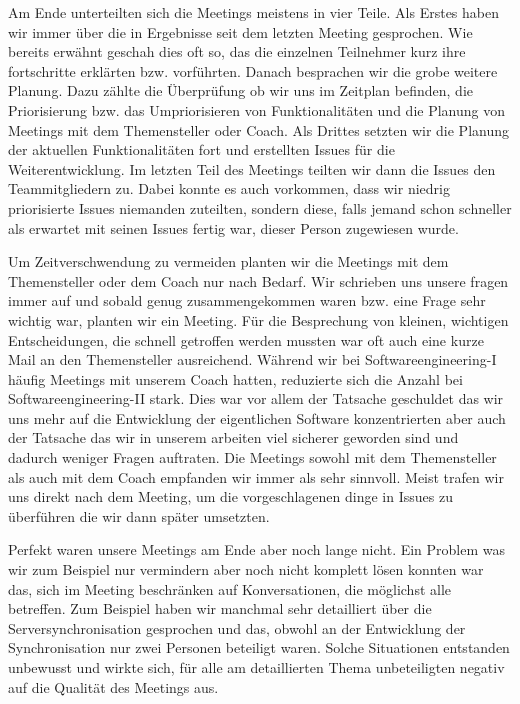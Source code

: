 \documentclass{article}
\begin{document}
Am Ende unterteilten sich die Meetings meistens in vier Teile. Als Erstes haben wir immer über die in Ergebnisse
seit dem letzten Meeting gesprochen. Wie bereits erwähnt geschah dies oft so, das die einzelnen Teilnehmer 
kurz ihre fortschritte erklärten bzw. vorführten.  Danach besprachen wir die grobe weitere Planung. Dazu zählte die 
Überprüfung ob wir uns im Zeitplan befinden, die Priorisierung bzw. das Umpriorisieren von Funktionalitäten und die 
Planung von Meetings mit dem Themensteller oder Coach. Als Drittes setzten wir die Planung der aktuellen Funktionalitäten 
fort und erstellten Issues für die Weiterentwicklung. Im letzten Teil des Meetings teilten wir dann die Issues 
den Teammitgliedern zu. Dabei konnte es auch vorkommen, dass wir niedrig priorisierte Issues niemanden zuteilten, sondern 
diese, falls jemand schon schneller als erwartet mit seinen Issues fertig war, dieser Person zugewiesen wurde.\par
\medskip
Um Zeitverschwendung zu vermeiden planten wir die Meetings mit dem Themensteller oder dem Coach nur nach Bedarf.
Wir schrieben uns unsere fragen immer auf und sobald genug zusammengekommen waren bzw. eine Frage sehr 
wichtig war, planten wir ein Meeting. Für die Besprechung von kleinen, wichtigen Entscheidungen,
die schnell getroffen werden mussten war oft auch eine kurze Mail an den Themensteller ausreichend.
Während wir bei Softwareengineering-I häufig Meetings mit unserem Coach hatten, reduzierte sich die Anzahl
bei Softwareengineering-II stark. Dies war vor allem der Tatsache geschuldet das wir uns mehr auf die Entwicklung
der eigentlichen Software konzentrierten aber auch der Tatsache das wir
in unserem arbeiten viel sicherer geworden sind und dadurch weniger Fragen auftraten.
Die Meetings sowohl mit dem Themensteller als auch mit dem Coach empfanden wir immer als sehr sinnvoll. Meist 
trafen wir uns direkt nach dem Meeting, um die vorgeschlagenen dinge in Issues zu überführen die wir dann später 
umsetzten.\par 
\medskip 
Perfekt waren unsere Meetings am Ende aber noch lange nicht. Ein Problem was wir zum Beispiel nur vermindern aber 
noch nicht komplett lösen konnten war das, sich im Meeting beschränken auf Konversationen, die möglichst alle betreffen.
Zum Beispiel haben wir manchmal sehr detailliert über die Serversynchronisation gesprochen und das, obwohl an der 
Entwicklung der Synchronisation nur zwei Personen beteiligt waren. Solche Situationen entstanden unbewusst und 
wirkte sich, für alle am detaillierten Thema unbeteiligten negativ auf die Qualität des Meetings aus.
\end{document}
